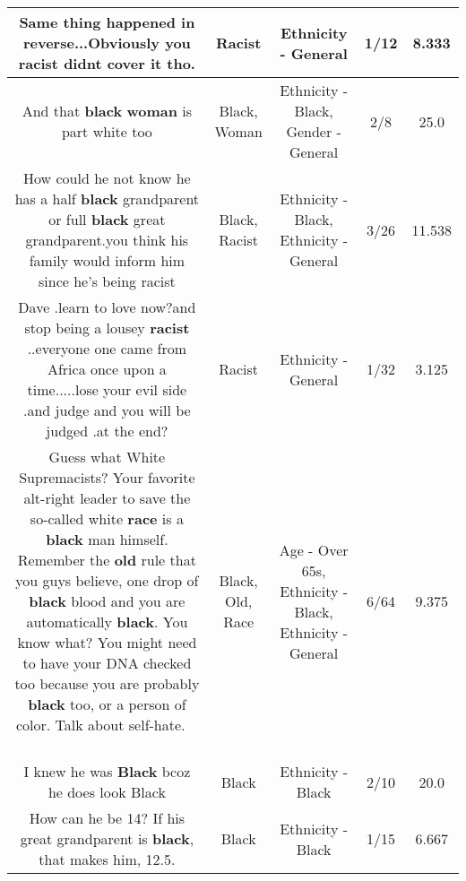 \documentclass[11pt]{article}
\newlength\mylength
\begin{document}
\begin{center}
\begin{longtable}{|C{.65\mylength}|C{.30\mylength}|C{.12\mylength}|C{.12\mylength}|C{.12\mylength}|}
  \small Same thing happened in reverse...Obviously you \textbf{racist} didnt cover it tho.\normalsize   & Racist & Ethnicity - General & 1/12 & 8.333 \\  \hline
  \small And that  \textbf{black} \textbf{woman} is part white too\normalsize   & Black, Woman & Ethnicity - Black, Gender - General & 2/8 & 25.0 \\  \hline
  \small How could he not know he has a half \textbf{black} grandparent or full \textbf{black} great grandparent.you think his family would inform him since he's being racist\normalsize   & Black, Racist & Ethnicity - Black, Ethnicity - General & 3/26 & 11.538 \\  \hline
  \small Dave .learn to love now?and stop being a lousey \textbf{racist} ..everyone one came from Africa once upon a time.....lose your evil side .and judge and you will be judged .at the end?\normalsize   & Racist & Ethnicity - General & 1/32 & 3.125 \\  \hline
  \small Guess what White Supremacists? Your favorite alt-right leader to save the so-called white \textbf{race} is a \textbf{black} man himself. Remember the \textbf{old} rule that you guys believe, one drop of \textbf{black} blood and you are automatically \textbf{black}. You know what? You might need to have your DNA checked too because you are probably \textbf{black} too, or a person of color. Talk about self-hate. 🤣😄😅😆😂\normalsize   & Black, Old, Race & Age - Over 65s, Ethnicity - Black, Ethnicity - General & 6/64 & 9.375 \\  \hline
  \small I knew he was \textbf{Black} bcoz he does look Black\normalsize   & Black & Ethnicity - Black & 2/10 & 20.0 \\  \hline
  \small How can he be 14? If his great grandparent is \textbf{black}, that makes him, 12.5.\normalsize   & Black & Ethnicity - Black & 1/15 & 6.667 \\  \hline

\end{longtable}
\end{center}
\end{document}
